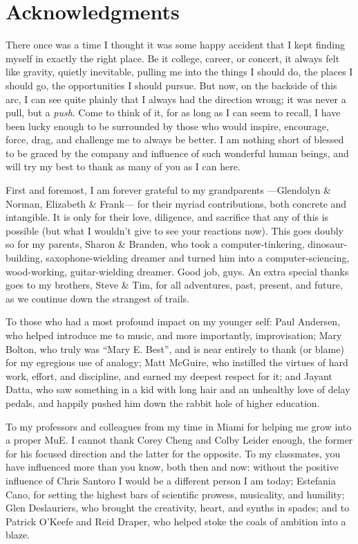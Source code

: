 
\chapter*{Acknowledgments}

There once was a time I thought it was some happy accident that I kept finding myself in exactly the right place.
Be it college, career, or concert, it always felt like gravity, quietly inevitable, pulling me into the things I should do, the places I should go, the opportunities I should pursue.
But now, on the backside of this arc, I can see quite plainly that I always had the direction wrong; it was never a pull, but a \emph{push}.
Come to think of it, for as long as I can seem to recall, I have been lucky enough to be surrounded by those who would inspire, encourage, force, drag, and challenge me to always be better.
I am nothing short of blessed to be graced by the company and influence of such wonderful human beings, and will try my best to thank as many of you as I can here.

First and foremost, I am forever grateful to my grandparents ---Glendolyn \& Norman, Elizabeth \& Frank--- for their myriad contributions, both concrete and intangible.
It is only for their love, diligence, and sacrifice that any of this is possible (but what I wouldn't give to see your reactions now).
This goes doubly so for my parents, Sharon \& Branden, who took a computer-tinkering, dinosaur-building, saxophone-wielding dreamer and turned him into a computer-sciencing, wood-working, guitar-wielding dreamer.
Good job, guys.
An extra special thanks goes to my brothers, Steve \& Tim, for all adventures, past, present, and future, as we continue down the strangest of trails.

To those who had a most profound impact on my younger self:
Paul Andersen, who helped introduce me to music, and more importantly, improvisation;
Mary Bolton, who truly was ``Mary E. Best'', and is near entirely to thank (or blame) for my egregious use of analogy;
Matt McGuire, who instilled the virtues of hard work, effort, and discipline, and earned my deepest respect for it;
and Jayant Datta, who saw something in a kid with long hair and an unhealthy love of delay pedals, and happily pushed him down the rabbit hole of higher education.

To my professors and colleagues from my time in Miami for helping me grow into a proper MuE.
I cannot thank Corey Cheng and Colby Leider enough, the former for his focused direction and the latter for the opposite.
To my classmates, you have influenced more than you know, both then and now:
without the positive influence of Chris Santoro I would be a different person I am today;
Estefania Cano, for setting the highest bars of scientific prowess, musicality, and humility;
Glen Deslauriers, who brought the creativity, heart, and synths in spades;
and to Patrick O'Keefe and Reid Draper, who helped stoke the coals of ambition into a blaze.

